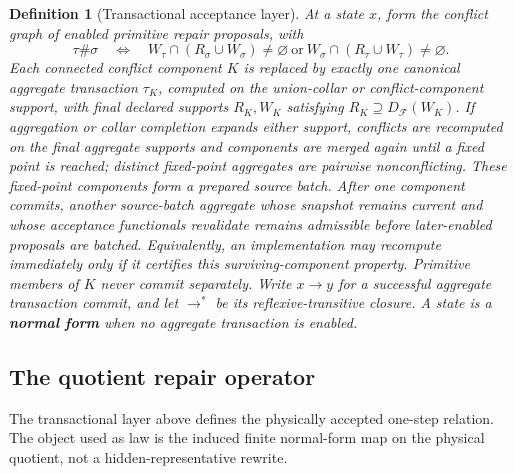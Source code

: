\documentclass[11pt]{article}
\newtheorem{definition}[theorem]{Definition}
\theoremstyle{remark}
\theoremstyle{plain}
\begin{document}
\begin{definition}[Transactional acceptance layer]
At a state \(x\), form the conflict graph of enabled primitive repair proposals, with
\[
\tau\#\sigma
\quad\Longleftrightarrow\quad
W_\tau\cap(R_\sigma\cup W_\sigma)\ne\varnothing
\ \text{or}\
W_\sigma\cap(R_\tau\cup W_\tau)\ne\varnothing .
\]
Each connected conflict component \(K\) is replaced by exactly one canonical aggregate transaction
\(\tau_K\), computed on the union-collar or conflict-component support, with final declared
supports \(R_K,W_K\) satisfying \(R_K\supseteq D_{\mathcal F}(W_K)\).
If aggregation or collar completion expands either support, conflicts are recomputed on the
final aggregate supports and components are merged again until a fixed point is reached; distinct
fixed-point aggregates are pairwise nonconflicting.  These fixed-point components form a prepared
source batch.  After one component commits, another source-batch aggregate whose snapshot remains
current and whose acceptance functionals revalidate remains admissible before later-enabled
proposals are batched.  Equivalently, an implementation may recompute immediately only if it
certifies this surviving-component property.  Primitive members of \(K\) never commit separately.
Write \(x\to y\) for a successful aggregate transaction commit, and
let \(\to^*\) be its reflexive-transitive closure. A state is a \textbf{normal form} when no
aggregate transaction is enabled.
\end{definition}

\subsection{The quotient repair operator}

The transactional layer above defines the physically accepted one-step relation.  The object used
as law is the induced finite normal-form map on the physical quotient, not a hidden-representative
rewrite.
\end{document}

